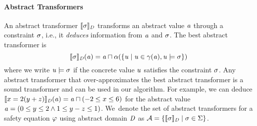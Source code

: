 
\paragraph{\textbf{Abstract Transformers}}
%
%
An abstract transformer $\llbracket \sigma\rrbracket_{\mathit{D}}$ transforms an abstract value $\mathit{a}$ through a
constraint $\sigma$, i.e., it \emph{deduces} information from $\mathit{a}$ and $\sigma$.
The best abstract transformer is 
\begin{equation}\label{eq:abstrans}
\llbracket \sigma\rrbracket_{\mathit{D}}(\mathit{a})=\mathit{a}\sqcap\alpha(\{\mathit{u}\mid \mathit{u}\in\gamma(\mathit{a}), \mathit{u}\models \sigma\})
\end{equation}
 where we write 
$\mathit{u}\models \sigma$ if the concrete value $\mathit{u}$ satisfies the constraint $\sigma$.
Any abstract transformer that over-approximates the best abstract
transformer is a sound transformer and can be used in our algorithm.
%
For example, we can deduce $\llbracket x=2(y+z)\rrbracket_{\mathit{D}}(\mathit{a})=\mathit{a}\sqcap(-2\leq x\leq 6)$ for the abstract value $\mathit{a}=(0\leq y \leq 2 \wedge 1 \leq y-z \leq 1)$.
%
We~denote the set of abstract transformers for a safety equation
$\varphi$ using abstract domain $\mathit{D}$ as
$\mathcal{A}=\{\llbracket \sigma\rrbracket_{\mathit{D}}\mid
\sigma\in\Sigma\}$.

